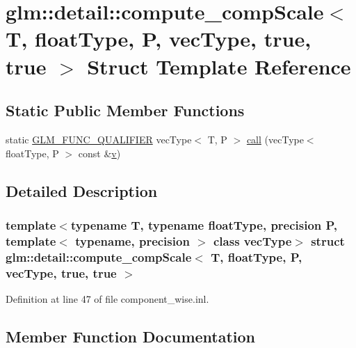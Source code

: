 \hypertarget{structglm_1_1detail_1_1compute__comp_scale_3_01_t_00_01float_type_00_01_p_00_01vec_type_00_01true_00_01true_01_4}{}\section{glm\+::detail\+::compute\+\_\+comp\+Scale$<$ T, float\+Type, P, vec\+Type, true, true $>$ Struct Template Reference}
\label{structglm_1_1detail_1_1compute__comp_scale_3_01_t_00_01float_type_00_01_p_00_01vec_type_00_01true_00_01true_01_4}
\subsection*{Static Public Member Functions}
\begin{DoxyCompactItemize}
\item 
static \mbox{\hyperlink{setup_8hpp_a33fdea6f91c5f834105f7415e2a64407}{G\+L\+M\+\_\+\+F\+U\+N\+C\+\_\+\+Q\+U\+A\+L\+I\+F\+I\+ER}} vec\+Type$<$ T, P $>$ \mbox{\hyperlink{structglm_1_1detail_1_1compute__comp_scale_3_01_t_00_01float_type_00_01_p_00_01vec_type_00_01true_00_01true_01_4_abbca70bf822f53099b06c2c14c200110}{call}} (vec\+Type$<$ float\+Type, P $>$ const \&\mbox{\hyperlink{glad_8h_a14cfbe2fc2234f5504618905b69d1e06}{v}})
\end{DoxyCompactItemize}


\subsection{Detailed Description}
\subsubsection*{template$<$typename T, typename float\+Type, precision P, template$<$ typename, precision $>$ class vec\+Type$>$\newline
struct glm\+::detail\+::compute\+\_\+comp\+Scale$<$ T, float\+Type, P, vec\+Type, true, true $>$}



Definition at line 47 of file component\+\_\+wise.\+inl.



\subsection{Member Function Documentation}
\mbox{\label{structglm_1_1detail_1_1compute__comp_scale_3_01_t_00_01float_type_00_01_p_00_01vec_type_00_01true_00_01true_01_4_abbca70bf822f53099b06c2c14c200110}} 
